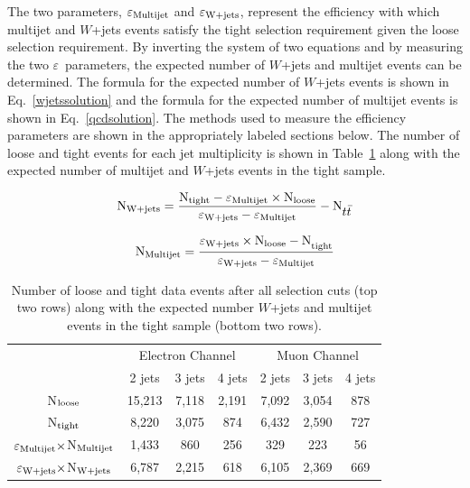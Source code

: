 The two parameters, $\varepsilon_{\rm{Multijet}}$ and $\varepsilon_{\rm{W+jets}}$, represent the efficiency with which multijet and $W$+jets events satisfy the tight selection requirement given the loose selection  requirement. By inverting the system of two equations and by measuring the two $\varepsilon$~parameters, the expected number of $W$+jets and multijet events can be determined. The formula for the expected number of $W$+jets events is shown in Eq.~\ref{wjetssolution} and the formula for the expected number of multijet events is shown in Eq.~\ref{qcdsolution}. The methods used to measure the efficiency parameters are shown in the appropriately labeled sections below. The number of loose and tight events for each jet multiplicity is shown in Table~\ref{nloosentight} along with the expected number of multijet and $W$+jets events in the tight sample.

\begin{equation}
\label{wjetssolution}
\rm{N}_{\rm{W+jets}} = \frac{\rm{N}_{\rm{tight}} - \varepsilon_{\rm{Multijet}} \times \rm{N}_{\rm{loose}}}{\varepsilon_{\rm{W+jets}}  - \varepsilon_{\rm{Multijet}}} - \rm{N}_{\mbox{$t\bar{t}$}}
\end{equation}

\begin{equation}
\label{qcdsolution}
\rm{N}_{\rm{Multijet}} = \frac{\rm{\varepsilon_{\rm{W+jets}} \times \rm{N}_{\rm{loose}} - N}_{\rm{tight}}}{\varepsilon_{\rm{W+jets}}  - \varepsilon_{\rm{Multijet}}}
\end{equation}


\vspace{0.2in}
\begin{table}[!h!tbp]
\begin{center}
\caption{Number of loose and tight data events after all selection cuts (top two rows) along with the expected number $W$+jets and multijet events in the tight sample (bottom two rows).}
\label{nloosentight}
\begin{tabular}{c|ccc|ccc}
& \multicolumn{3}{c|}{Electron Channel} & \multicolumn{3}{c}{Muon Channel}    \\
                               & 2 jets & 3 jets & 4 jets
                               & 2 jets & 3 jets & 4 jets \\
\hline
N$_{{\rm loose}}$              	& 15,213 &  7,118 &  2,191 &   7,092 &  3,054 &   878	\\
N$_{{\rm tight}}$              	& 8,220 &  3,075 &    874 &   6,432 &  2,590 &   727		\\
$\varepsilon_{\rm{Multijet}}\times$N$_{\rm{Multijet}}$	& 1,433 &    860 &    256 &    329 &    223 &    56	\\
$\varepsilon_{\rm{W+jets}}\times$N$_{\rm{W+jets}}$		& 6,787 &  2,215 &    618 &   6,105 &  2,369 &   669
\end{tabular}
\vspace{-0.1in}
\end{center}
\end{table}


